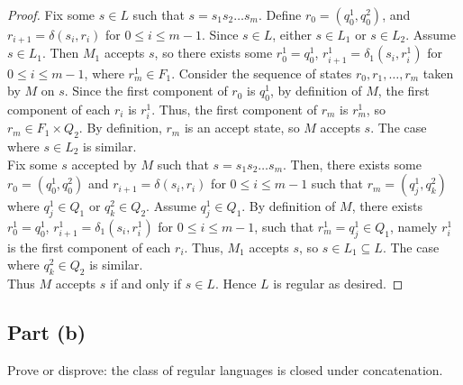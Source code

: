 \documentclass{article}
\begin{document}
\begin{proof}
    \noindent
    Fix some $s \in L$ such that $s = s_1 s_2 \ldots s_m$. Define $r_0 = (q_0^1, q_0^2)$, and $r_{i+1} = \delta(s_i, r_i)$ for $0 \leq i \leq m - 1$. Since 
    $s \in L$, either $s \in L_1$ or $s \in L_2$. Assume $s \in L_1$. Then $M_1$ accepts $s$, so there exists some $r_0^1 = q_0^1$, 
    $r_{i+1}^1 = \delta_1(s_i, r_i^1)$ for $0 \leq i \leq m - 1$, where $r_m^1 \in F_1$. Consider the sequence of states $r_0, r_1, \ldots, r_m$ taken by $M$ on 
    $s$. Since the first component of $r_0$ is $q_0^1$, by definition of $M$, the first component of each $r_i$ is $r_i^1$. Thus, the first component of $r_m$ 
    is $r_m^1$, so $r_m \in F_1 \times Q_2$. By definition, $r_m$ is an accept state, so $M$ accepts $s$. The case where $s \in L_2$ is similar. \\

    \noindent
    Fix some $s$ accepted by $M$ such that $s = s_1 s_2 \ldots s_m$. Then, there exists some $r_0 = (q_0^1, q_0^2)$ and $r_{i+1} = \delta(s_i, r_i)$ for 
    $0 \leq i \leq m - 1$ such that $r_m = (q_j^1, q_k^2)$ where $q_j^1 \in Q_1$ or $q_k^2 \in Q_2$. Assume $q_j^1 \in Q_1$. By definition of $M$, there exists 
    $r_0^1 = q_0^1$, $r_{i+1}^1 = \delta_1(s_i, r_i^1)$ for $0 \leq i \leq m - 1$, such that $r_{m}^1 = q_j^1 \in Q_1$, namely $r_i^1$ is the first component of
    each $r_i$. Thus, $M_1$ accepts $s$, so $s \in L_1 \subseteq L$. The case where $q_k^2 \in Q_2$ is similar. \\

    \noindent
    Thus $M$ accepts $s$ if and only if $s \in L$. Hence $L$ is regular as desired.
\end{proof}

\subsection*{Part (b)}

Prove or disprove: the class of regular languages is closed under concatenation.
\end{document}
